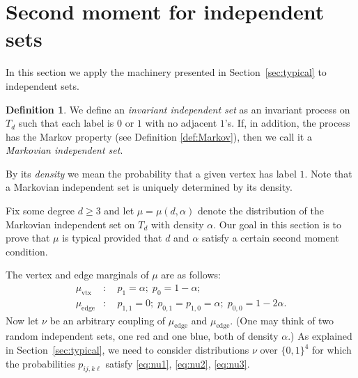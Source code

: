 \documentclass[12pt]{amsart}
\theoremstyle{definition}
\newtheorem{definition}[theorem]{Definition}
\newcommand\al{\alpha}
\newcommand\muedge{\mu_\mathrm{edge}}
\newcommand\muvtx{\mu_\mathrm{vtx}}
\begin{document}
\section{Second moment for independent sets} \label{sec:sm_indep}

In this section we apply the machinery presented in Section~\ref{sec:typical} to independent sets. 
%
\begin{definition} \label{def:Markov_indep}
We define an \emph{invariant independent set} as an invariant process on $T_d$ such that each label is $0$ or $1$ with no adjacent $1$'s. If, in addition, the process has the Markov property (see Definition \ref{def:Markov}), then we call it a \emph{Markovian independent set}.

By its \emph{density} we mean the probability that a given vertex has label $1$. Note that a Markovian independent set is uniquely determined by its density.
\end{definition}
%

Fix some degree $d \geq 3$ and let $\mu = \mu(d,\al)$ denote the distribution of the Markovian independent set on $T_d$ with density $\al$. Our goal in this section is to prove that $\mu$ is typical provided that $d$ and $\al$ satisfy a certain second moment condition.

The vertex and edge marginals of $\mu$ are as follows:
%
\begin{align*} 
\muvtx&: \quad 
p_1=\al; \; p_0=1-\al; \\
\muedge&: \quad 
p_{1,1}=0; \; p_{0,1}=p_{1,0}=\al; \; p_{0,0}=1-2\al .
\end{align*}
%
Now let $\nu$ be an arbitrary coupling of $\muedge$ and $\muedge$. (One may think of two random independent sets, one red and one blue, both of density $\al$.) As explained in Section~\ref{sec:typical}, we need to consider distributions $\nu$ over $\{0,1\}^4$ for which the probabilities $p_{ij,k\ell}$ satisfy \eqref{eq:nu1}, \eqref{eq:nu2}, \eqref{eq:nu3}.
\end{document}
